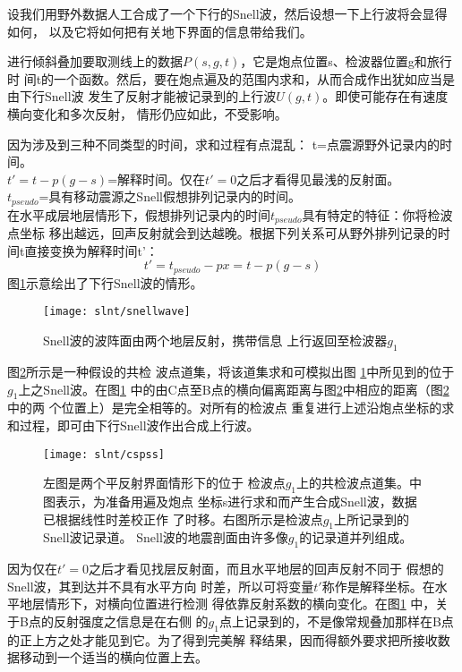 设我们用野外数据人工合成了一个下行的Snell波，然后设想一下上行波将会显得如何，
以及它将如何把有关地下界面的信息带给我们。

进行倾斜叠加要取测线上的数据$P(s,g,t)$，它是炮点位置s、检波器位置g和旅行时
间t的一个函数。然后，要在炮点遍及的范围内求和，从而合成作出犹如应当是由下行Snell波
发生了反射才能被记录到的上行波$U(g,t)$。即使可能存在有速度横向变化和多次反射，
情形仍应如此，不受影响。

因为涉及到三种不同类型的时间，求和过程有点混乱：
t=点震源野外记录内的时间。\\
$t'=t-p(g-s)$=解释时间。仅在$t'=0$之后才看得见最浅的反射面。\\
$t_{pseudo}$=具有移动震源之Snell假想排列记录内的时间。\\

在水平成层地层情形下，假想排列记录内的时间$t_{pseudo}$具有特定的特征：你将检波点坐标
移出越远，回声反射就会到达越晚。根据下列关系可从野外排列记录的时间t直接变换为解释时间t'：
\begin{equation}
t'=t_{pseudo}-px=t-p(g-s)
\label{eq:ex5.3.1}
\end{equation}
图\ref{fig:slnt/snellwave}示意绘出了下行Snell波的情形。

\begin{figure}[H]
\centering
\texttt{[image: slnt/snellwave]}
\caption[snellwave]{Snell波的波阵面由两个地层反射，携带信息
上行返回至检波器$g_1$
}
\label{fig:slnt/snellwave}
\end{figure}

图\ref{fig:slnt/cspss}所示是一种假设的共检
波点道集，将该道集求和可模拟出图
\ref{fig:slnt/snellwave}中所见到的位于$g_1$上之Snell波。在图\ref{fig:slnt/snellwave}
中的由C点至B点的横向偏离距离与图\ref{fig:slnt/cspss}中相应的距离（图\ref{fig:slnt/cspss}中的两
个位置上）是完全相等的。对所有的检波点
重复进行上述沿炮点坐标的求和过程，即可由下行Snell波作出合成上行波。

\begin{figure}[H]
\centering
\texttt{[image: slnt/cspss]}
\caption[cspss]{左图是两个平反射界面情形下的位于
检波点$g_1$上的共检波点道集。中图表示，为准备用遍及炮点
坐标s进行求和而产生合成Snell波，数据已根据线性时差校正作
了时移。右图所示是检波点$g_1$上所记录到的Snell波记录道。
Snell波的地震剖面由许多像$g_1$的记录道并列组成。
}
\label{fig:slnt/cspss}
\end{figure}

因为仅在$t'=0$之后才看见找层反射面，而且水平地层的回声反射不同于
假想的Snell波，其到达并不具有水平方向
时差，所以可将变量$t'$称作是解释坐标。在水平地层情形下，对横向位置进行检测
得依靠反射系数的横向变化。在图\ref{fig:slnt/snellwave}
中，关于B点的反射强度之信息是在右侧
的$g_1$点上记录到的，不是像常规叠加那样在B点的正上方之处才能见到它。为了得到完美解
释结果，因而得额外要求把所接收数据移动到一个适当的横向位置上去。

